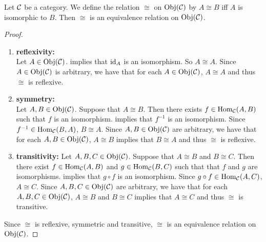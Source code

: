 \documentclass{book}
\begin{document}
	\begin{ex} 
		Let $\mathcal{C}$ be a category. We define the relation $\cong$ on $\operatorname{Obj}(\mathcal{C})$ by $A \cong B$ iff $A$ is isomorphic to $B$. Then $\cong$ is an equivalence relation on $\operatorname{Obj}(\mathcal{C})$.
	\end{ex}
	
	\begin{proof} \
		\begin{enumerate}
			\item \textbf{reflexivity: } \\
			Let $A \in \operatorname{Obj}(\mathcal{C})$.  implies that $\operatorname{id}_A$ is an isomorphism. So $A \cong A$. Since $A \in \operatorname{Obj}(\mathcal{C})$ is arbitrary, we have that for each $A \in \operatorname{Obj}(\mathcal{C})$, $A \cong A$ and thus $\cong$ is reflexive. 
			\item \textbf{symmetry: } \\
			Let $A, B \in \operatorname{Obj}(\mathcal{C})$. Suppose that $A \cong B$. Then there exists $f \in \operatorname{Hom}_{\mathcal{C}}(A,B)$ such that $f$ is an isomorphism.  implies that $f^{-1}$ is an isomorphism. Since $f^{-1} \in \operatorname{Hom}_{\mathcal{C}}(B, A)$, $B \cong A$.  Since $A, B \in \operatorname{Obj}(\mathcal{C})$ are arbitrary, we have that for each $A, B \in \operatorname{Obj}(\mathcal{C})$, $A \cong B$ implies that $B \cong A$ and thus $\cong$ is reflexive. 
			\item \textbf{transitivity: }
			Let $A, B, C \in \operatorname{Obj}(\mathcal{C})$. Suppose that $A \cong B$ and $B \cong C$. Then there exist $f \in \operatorname{Hom}_{\mathcal{C}}(A,B)$ and $g \in \operatorname{Hom}_{\mathcal{C}}(B, C)$ such that that $f$ and $g$ are isomorphisms.  implies that $g \circ f$ is an isomorphism. Since $g \circ f \in \operatorname{Hom}_{\mathcal{C}}(A, C)$, $A \cong C$. Since $A, B, C \in \operatorname{Obj}(\mathcal{C})$ are arbitrary, we have that for each $A, B, C \in \operatorname{Obj}(\mathcal{C})$, $A \cong B$ and $B \cong C$ implies that $A \cong C$ and thus $\cong$ is transitive. 
		\end{enumerate}
		Since $\cong$ is reflexive, symmetric and transitive, $\cong$ is an equivalence relation on $\operatorname{Obj}(\mathcal{C})$.
	\end{proof}
	
\end{document}
